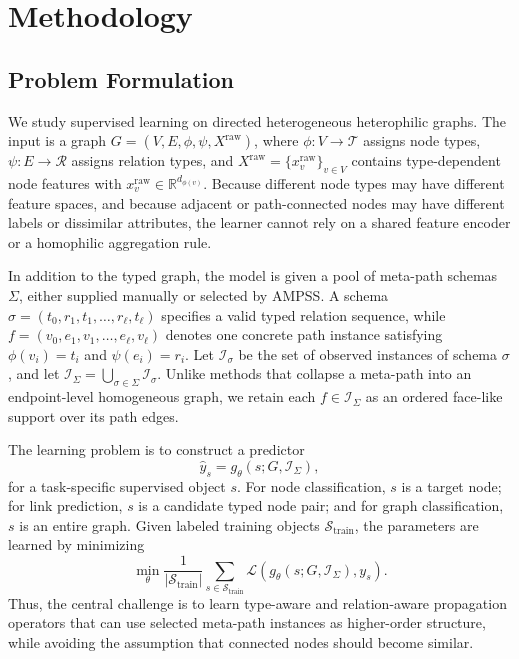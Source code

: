 \documentclass[sigconf,anonymous,review]{acmart}
\newcommand{\R}{\mathbb{R}}
\newcommand{\ampss}{\textsc{AMPSS}}
\begin{document}
\section{Methodology}
\label{sec:method}

\subsection{Problem Formulation}

We study supervised learning on directed heterogeneous heterophilic graphs.  The
input is a graph
\(G=(V,E,\phi,\psi,X^{\mathrm{raw}})\), where
\(\phi:V\rightarrow\mathcal{T}\) assigns node types,
\(\psi:E\rightarrow\mathcal{R}\) assigns relation types, and
\(X^{\mathrm{raw}}=\{x_v^{\mathrm{raw}}\}_{v\in V}\) contains type-dependent node features with
\(x_v^{\mathrm{raw}}\in\R^{d_{\phi(v)}}\).  Because different node types may have different feature
spaces, and because adjacent or path-connected nodes may have different labels or dissimilar
attributes, the learner cannot rely on a shared feature encoder or a homophilic aggregation rule.

In addition to the typed graph, the model is given a pool of meta-path schemas
\(\Sigma\), either supplied manually or selected by \ampss{}.  A schema
\(\sigma=(t_0,r_1,t_1,\ldots,r_\ell,t_\ell)\) specifies a valid typed relation sequence, while
\(f=(v_0,e_1,v_1,\ldots,e_\ell,v_\ell)\) denotes one concrete path instance satisfying
\(\phi(v_i)=t_i\) and \(\psi(e_i)=r_i\).  Let \(\mathcal{I}_\sigma\) be the set of observed
instances of schema \(\sigma\), and let
\(\mathcal{I}_\Sigma=\bigcup_{\sigma\in\Sigma}\mathcal{I}_\sigma\).  Unlike methods that collapse a
meta-path into an endpoint-level homogeneous graph, we retain each
\(f\in\mathcal{I}_\Sigma\) as an ordered face-like support over its path edges.

The learning problem is to construct a predictor
\[
  \hat{y}_s
  =
  g_\theta(s;G,\mathcal{I}_\Sigma),
\]
for a task-specific supervised object \(s\).  For node classification, \(s\) is a target node; for
link prediction, \(s\) is a candidate typed node pair; and for graph classification, \(s\) is an
entire graph.  Given labeled training objects \(\mathcal{S}_{\mathrm{train}}\), the parameters are
learned by minimizing
\[
  \min_\theta
  \frac{1}{|\mathcal{S}_{\mathrm{train}}|}
  \sum_{s\in\mathcal{S}_{\mathrm{train}}}
  \mathcal{L}\!\left(g_\theta(s;G,\mathcal{I}_\Sigma),y_s\right).
\]
Thus, the central challenge is to learn type-aware and relation-aware propagation operators that
can use selected meta-path instances as higher-order structure, while avoiding the assumption that
connected nodes should become similar.
\end{document}
